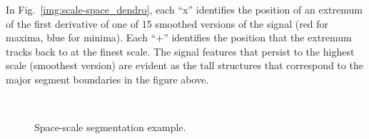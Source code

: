 In Fig.~\ref{img:scale-space_dendro}, each ``x'' identifies the position of an extremum of the first derivative of one of 15 smoothed versions of the signal (red for maxima, blue for minima). Each ``+'' identifies the position that the extremum tracks back to at the finest scale. The signal features that persist to the highest scale (smoothest version) are evident as the tall structures that correspond to the major segment boundaries in the figure above.

\begin{figure}
\centering
{} \\
%
\caption[Space-scale segmentation]{Space-scale segmentation example.}
\label{img:scale-space_segm_ex}
\end{figure}


